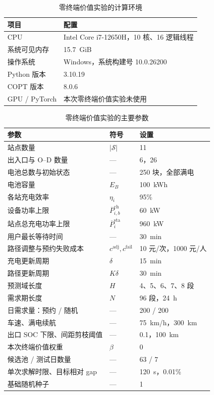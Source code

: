 \begin{table}[!htbp]
  \centering
  \caption{零终端价值实验的计算环境}
  \label{exp:environment}
  \small
  \begin{tabularx}{0.88\linewidth}{@{}lX@{}}
    \toprule
    项目 & 配置 \\
    \midrule
    CPU & Intel Core i7-12650H，10 核、16 逻辑线程 \\
    系统可见内存 & 15.7~GiB \\
    操作系统 & Windows，系统构建号 10.0.26200 \\
    Python 版本 & 3.10.19 \\
    COPT 版本 & 8.0.6 \\
    GPU / PyTorch & 本次零终端价值实验未使用 \\
    \bottomrule
  \end{tabularx}
\end{table}

\begin{table}[!htbp]
  \centering
  \caption{零终端价值实验的主要参数}
  \label{exp:parameters}
  \small
  \setlength{\tabcolsep}{5pt}
  \begin{tabularx}{\linewidth}{@{}Xll@{}}
    \toprule
    参数 & 符号 & 设置 \\
    \midrule
    站点数量 & $|\mathcal S|$ & 11 \\
    出入口与 O--D 数量 & --- & 6，26 \\
    电池总数与初始状态 & --- & 250 块，全部满电 \\
    电池容量 & $E_B$ & 100~kWh \\
    各站充电效率 & $\eta_i$ & 95\% \\
    设备功率上限 & $\overline P_{i,b}^{\mathrm{ch}}$ & 60~kW \\
    站点总充电功率上限 & $\overline P_i^{\mathrm{sta}}$ & 960~kW \\
    用户最长等待时间 & --- & 30~min \\
    路径调整与预约失败成本 & $c^{\mathrm{adj}},c^{\mathrm{fail}}$ & 10 元/次，1000 元/人 \\
    充电更新周期 & $\delta$ & 15~min \\
    路径更新周期 & $K\delta$ & 30~min \\
    预测域长度 & $H$ & 4、5、6、7、8 段 \\
    需求期长度 & $N$ & 96 段，24~h \\
    日需求量：预约 / 随机 & --- & 200 / 200 \\
    车速、满电续航 & --- & 75~km/h，300~km \\
    出口 SOC 下限、间距剪枝阈值 & --- & 0.1，100~km \\
    本次终端价值权重 & $\beta$ & 0 \\
    候选池 / 测试日数量 & --- & 63 / 7 \\
    单次求解时限、目标相对 gap & --- & 120~s，0.01\% \\
    基础随机种子 & --- & 1 \\
    \bottomrule
  \end{tabularx}
\end{table}

